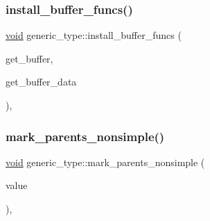 \mbox{\label{classgeneric__type_abc4faaa9d97d488abb99634dc3f0b88f}} 
\subsubsection{\texorpdfstring{install\_buffer\_funcs()}{install\_buffer\_funcs()}}
{\footnotesize\ttfamily \mbox{\hyperlink{_s_d_l__opengles2__gl2ext_8h_ae5d8fa23ad07c48bb609509eae494c95}{void}} generic\+\_\+type\+::install\+\_\+buffer\+\_\+funcs (\begin{DoxyParamCaption}\item[{\mbox{\hyperlink{structbuffer__info}{buffer\+\_\+info}} $\ast$($\ast$)(\mbox{\hyperlink{_python27_2object_8h_aadc84ac7aed2cfa6f20c25f62bf3dac7}{Py\+Object}} $\ast$, \mbox{\hyperlink{_s_d_l__opengles2__gl2ext_8h_ae5d8fa23ad07c48bb609509eae494c95}{void}} $\ast$)}]{get\+\_\+buffer,  }\item[{\mbox{\hyperlink{_s_d_l__opengles2__gl2ext_8h_ae5d8fa23ad07c48bb609509eae494c95}{void}} $\ast$}]{get\+\_\+buffer\+\_\+data }\end{DoxyParamCaption})\hspace{0.3cm}{\ttfamily [inline]}, {\ttfamily [protected]}}

\mbox{\label{classgeneric__type_aa102cbe989b604345c02dcd821f6c5b2}} 
\subsubsection{\texorpdfstring{mark\_parents\_nonsimple()}{mark\_parents\_nonsimple()}}
{\footnotesize\ttfamily \mbox{\hyperlink{_s_d_l__opengles2__gl2ext_8h_ae5d8fa23ad07c48bb609509eae494c95}{void}} generic\+\_\+type\+::mark\+\_\+parents\+\_\+nonsimple (\begin{DoxyParamCaption}\item[{\mbox{\hyperlink{_python27_2object_8h_a42a55dd6e973872c7a6bc61632070f6f}{Py\+Type\+Object}} $\ast$}]{value }\end{DoxyParamCaption})\hspace{0.3cm}{\ttfamily [inline]}, {\ttfamily [protected]}}



